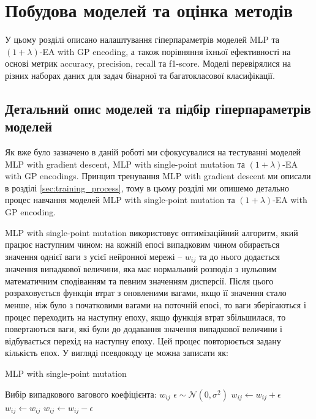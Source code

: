 \chapter{Побудова моделей та оцінка методів}
\label{chap:practice}

У цьому розділі описано налаштування гіперпараметрів моделей MLP та $(1+\lambda)$-EA with GP encoding, а також порівняння їхньої ефективності на основі метрик accuracy, precision, recall та f1-score. Моделі перевірялися на різних наборах даних для задач бінарної та багатокласової класифікації.

\section{Детальний опис моделей та підбір гіперпараметрів моделей}

Як вже було зазначено в даній роботі ми сфокусувалися на тестуванні моделей MLP with gradient descent, MLP with single-point mutation та $(1+\lambda)$-EA with GP encodings. Принцип тренування MLP with gradient descent ми описали в розділі \ref{sec:training_process}, тому в цьому розділі ми опишемо детально процес навчання моделей MLP with single-point mutation та $(1+\lambda)$-EA with GP encoding.

MLP with single-point mutation використовує оптимізаційний алгоритм, який працює наступним чином: на кожній епосі випадковим чином обирається значення однієї ваги з усієї нейронної мережі -- $w_{ij}$ та до нього додається значення випадкової величини, яка має нормальний розподіл з нульовим математичним сподіванням та певним значенням дисперсії. Після цього розраховується функція втрат з оновленими вагами, якщо її значення стало менше, ніж було з початковими вагами на поточній епосі, то ваги зберігаються і процес переходить на наступну епоху, якщо функція втрат збільшилася, то повертаються ваги, які були до додавання значення випадкової величини і відбувається перехід на наступну епоху. Цей процес повторюється задану кількість епох. У вигляді псевдокоду це можна записати як:

\begin{algorithm}
	\caption{MLP with single-point mutation}
	\begin{algorithmic}[1]
		\STATE Вибір випадкового вагового коефіцієнта: $w_{ij}$
		\STATE $\epsilon \sim \mathcal{N}(0, \sigma^2)$
		\STATE $w_{ij} \gets w_{ij} + \epsilon$
		\STATE $w_{ij} \gets w_{ij}$
		\ELSE
		\STATE $w_{ij} \gets w_{ij} - \epsilon$
		\ENDIF
	\end{algorithmic}
\end{algorithm}

